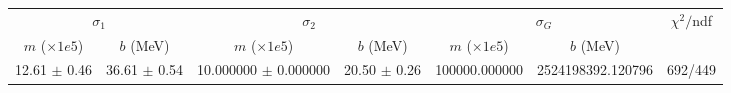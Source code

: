 \begin{tabular}{cc|cc|cc||c}
\multicolumn{2}{c|}{$\sigma_1$} & \multicolumn{2}{|c}{$\sigma_2$} & \multicolumn{2}{|c}{$\sigma_G$}  & \multirow{2}{*}{$\chi^2/$ndf}\\
$m$ ($\times1e5$) & $b$ (MeV) & $m$ ($\times1e5$) & $b$ (MeV) & $m$ ($\times1e5$) & $b$ (MeV) & \\
\hline
12.61 $\pm$ 0.46 & 36.61 $\pm$ 0.54 & 10.000000 $\pm$ 0.000000 & 20.50 $\pm$ 0.26 & 100000.000000 & 2524198392.120796 & 692/449\\
\end{tabular}
